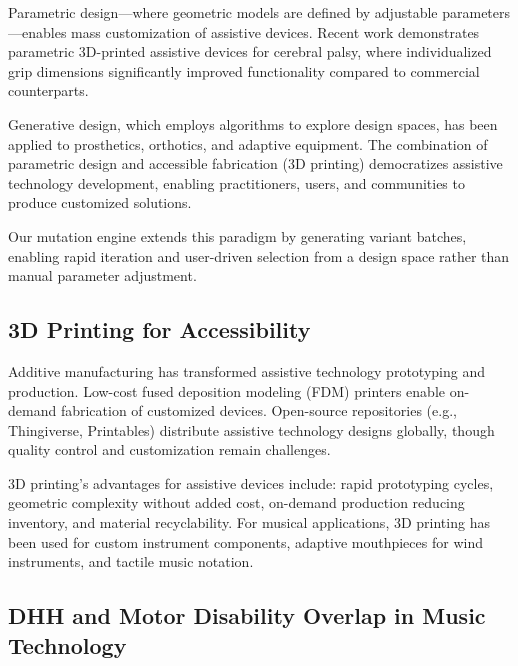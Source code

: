 \documentclass[sigconf]{nimeart}
\begin{document}
Parametric design—where geometric models are defined by adjustable parameters—enables mass customization of assistive devices\cite{tandon2023parametric}. Recent work demonstrates parametric 3D-printed assistive devices for cerebral palsy\cite{santos2023parametric}, where individualized grip dimensions significantly improved functionality compared to commercial counterparts.


Generative design, which employs algorithms to explore design spaces, has been applied to prosthetics, orthotics, and adaptive equipment. The combination of parametric design and accessible fabrication (3D printing) democratizes assistive technology development, enabling practitioners, users, and communities to produce customized solutions\cite{hofmann2020living}.

Our mutation engine extends this paradigm by generating variant batches, enabling rapid iteration and user-driven selection from a design space rather than manual parameter adjustment.

\subsection{3D Printing for Accessibility}

Additive manufacturing has transformed assistive technology prototyping and production\cite{desai20193dprinting}. Low-cost fused deposition modeling (FDM) printers enable on-demand fabrication of customized devices. Open-source repositories (e.g., Thingiverse, Printables) distribute assistive technology designs globally, though quality control and customization remain challenges.


3D printing's advantages for assistive devices include: rapid prototyping cycles, geometric complexity without added cost, on-demand production reducing inventory, and material recyclability. For musical applications, 3D printing has been used for custom instrument components, adaptive mouthpieces for wind instruments\cite{holland2020expanding}, and tactile music notation\cite{manenti2024accessibility}.

\subsection{DHH and Motor Disability Overlap in Music Technology}
\end{document}
